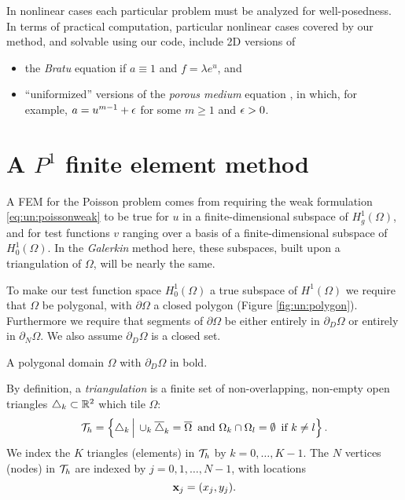 In nonlinear cases each particular problem must be analyzed for well-posedness.  In terms of practical computation, particular nonlinear cases covered by our method, and solvable using our code, include 2D versions of
\begin{itemize}
\item the \emph{Bratu} equation if $a\equiv 1$ and $f=\lambda e^u$, and
\item ``uniformized'' versions of the \emph{porous medium} equation \citep{Ockendonetal2003}, in which, for example, $a=u^{m-1}+\epsilon$ for some $m\ge 1$ and $\epsilon>0$.
\end{itemize}


\section{A $P^1$ finite element method}


A FEM for the Poisson problem comes from requiring the weak formulation \eqref{eq:un:poissonweak} to be true for $u$ in a finite-dimensional subspace of $H_{g}^1(\Omega)$, and for test functions $v$ ranging over a basis of a finite-dimensional subspace of $H_{0}^1(\Omega)$.  In the \emph{Galerkin} method here, these subspaces, built upon a triangulation of $\Omega$, will be nearly the same.

To make our test function space $H_{0}^1(\Omega)$ a true subspace of $H^1(\Omega)$ we require that $\Omega$ be polygonal, with $\partial\Omega$ a closed polygon (Figure \ref{fig:un:polygon}).  Furthermore we require that segments of $\partial\Omega$ be either entirely in $\partial_D\Omega$ or entirely in $\partial_N\Omega$.  We also assume $\partial_D\Omega$ is a closed set.

\begin{marginfigure}

\caption{A polygonal domain $\Omega$ with $\partial_D\Omega$ in bold.}
\label{fig:un:polygon}
\end{marginfigure}

By definition, a \emph{triangulation} is a finite set of non-overlapping, non-empty open triangles $\triangle_k\subset \mathbb{R}^2$ which tile $\Omega$:
\begin{equation}
\mathcal{T}_h = \left\{\triangle_k \,\Big|\, \cup_k \overline{\triangle}_k = \overline{\Omega} \, \text{ and} \,\, \Omega_k \cap \Omega_l = \emptyset \, \text{ if } k\ne l\right\}. \label{eq:un:triangulation}
\end{equation}
We index the $K$ triangles (elements) in $\mathcal{T}_h$ by $k=0,\dots,K-1$.  The $N$ vertices (nodes) in $\mathcal{T}_h$ are indexed by $j=0,1,\dots,N-1$, with locations
\begin{equation*}
\mathbf{x}_j = (x_j,y_j).
\end{equation*}

